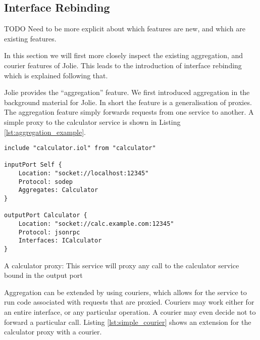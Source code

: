 \subsection{Interface Rebinding}
\label{sec:interface_rebinding}

TODO Need to be more explicit about which features are new, and which are
existing features.

In this section we will first more closely inspect the existing aggregation,
   and courier features of Jolie. This leads to the introduction of interface
   rebinding which is explained following that.

Jolie provides the ``aggregation'' feature. We first introduced aggregation in
the background material for Jolie. In short the feature is a generalisation of
proxies. The aggregation feature simply forwards requests from one service to
another. A simple proxy to the calculator service is shown in Listing
\ref{lst:aggregation_example}.

\begin{listing}[H]
\begin{verbatim}
include "calculator.iol" from "calculator"

inputPort Self {
    Location: "socket://localhost:12345"
    Protocol: sodep
    Aggregates: Calculator
}

outputPort Calculator {
    Location: "socket://calc.example.com:12345"
    Protocol: jsonrpc
    Interfaces: ICalculator
}
\end{verbatim}

\caption{A calculator proxy: This service will proxy any call to the calculator
    service bound in the output port }

\label{lst:aggregation_example}

\end{listing}

Aggregation can be extended by using couriers, which allows for the service to
run code associated with requests that are proxied. Couriers may work either
for an entire interface, or any particular operation. A courier may even
decide not to forward a particular call. Listing \ref{lst:simple_courier} shows
an extension for the calculator proxy with a courier.

